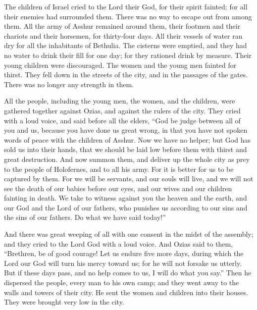  The children of Israel cried to the Lord their God, for
their spirit fainted; for all their enemies had surrounded them. There
was no way to escape out from among them.  All the army of
Asshur remained around them, their footmen and their chariots and their
horsemen, for thirty-four days. All their vessels of water ran dry for
all the inhabitants of Bethulia.  The cisterns were
emptied, and they had no water to drink their fill for one day; for they
rationed drink by measure.  Their young children were
discouraged. The women and the young men fainted for thirst. They fell
down in the streets of the city, and in the passages of the gates. There
was no longer any strength in them.

 All the people, including the young men, the women, and
the children, were gathered together against Ozias, and against the
rulers of the city. They cried with a loud voice, and said before all
the elders,  ``God be judge between all of you and us,
because you have done us great wrong, in that you have not spoken words
of peace with the children of Asshur.  Now we have no
helper; but God has sold us into their hands, that we should be laid low
before them with thirst and great destruction.  And now
summon them, and deliver up the whole city as prey to the people of
Holofernes, and to all his army.  For it is better for us
to be captured by them. For we will be servants, and our souls will
live, and we will not see the death of our babies before our eyes, and
our wives and our children fainting in death.  We take to
witness against you the heaven and the earth, and our God and the Lord
of our fathers, who punishes us according to our sins and the sins of
our fathers. Do what we have said today!''

 And there was great weeping of all with one consent in the
midst of the assembly; and they cried to the Lord God with a loud voice.
 And Ozias said to them, ``Brethren, be of good courage!
Let us endure five more days, during which the Lord our God will turn
his mercy toward us; for he will not forsake us utterly. 
But if these days pass, and no help comes to us, I will do what you
say.''  Then he dispersed the people, every man to his own
camp; and they went away to the walls and towers of their city. He sent
the women and children into their houses. They were brought very low in
the city.

